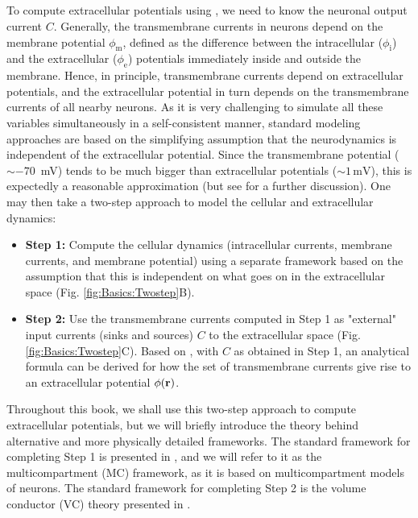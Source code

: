 \subsection{}
\label{sec:Basics:twostep}
To compute extracellular potentials using , we need to know the neuronal output current $C$. Generally, the transmembrane currents in neurons depend on the membrane potential $\phi_\text{m}$, defined as the difference between the intracellular ($\phi_\text{i}$) and the extracellular ($\phi_\text{e}$) potentials immediately inside and outside the membrane. Hence, in principle, transmembrane currents depend on extracellular potentials, and the extracellular potential in turn depends on the transmembrane currents of all nearby neurons. As it is very challenging to simulate all these variables simultaneously in a self-consistent manner, standard modeling approaches are based on the simplifying assumption that the neurodynamics is independent of the extracellular potential. Since the transmembrane potential ($\sim -70$~\si{\milli\volt}) tends to be much bigger than extracellular potentials ($\sim 1 \,\si{\milli\volt}$), this is expectedly a reasonable approximation (but see  for a further discussion). One may then take a two-step approach to model the cellular and extracellular dynamics:

\begin{itemize}
\item {\bf Step 1:} Compute the cellular dynamics (intracellular currents, membrane currents, and membrane potential) using a separate framework based on the assumption that this is independent on what goes on in the extracellular space (Fig. \ref{fig:Basics:Twostep}B).

\item {\bf Step 2:} Use the transmembrane currents computed in Step 1 as "external" input currents (sinks and sources) $C$ to the extracellular space (Fig. \ref{fig:Basics:Twostep}C). Based on , with $C$ as obtained in Step 1, an analytical formula can be derived for how the set of transmembrane currents give rise to an extracellular potential $\phi({\bf r})$.
\end{itemize}

Throughout this book, we shall use this two-step approach to compute extracellular potentials, but we will briefly introduce the theory behind alternative and more physically detailed frameworks. The standard framework for completing Step 1 is presented in , and we will refer to it as the multicompartment (MC) framework, as it is based on multicompartment models of neurons. The standard framework for completing Step 2 is the volume conductor (VC) theory presented in  .



